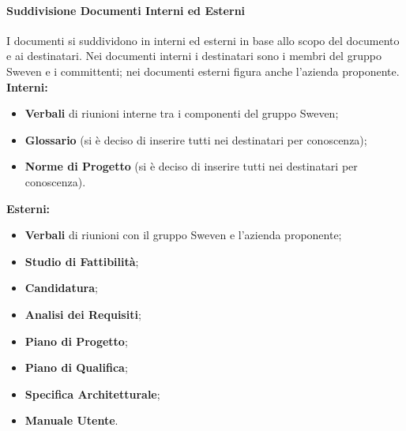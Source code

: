 \paragraph{Suddivisione Documenti Interni ed Esterni}
I documenti si suddividono in interni ed esterni in base allo scopo del documento e ai destinatari.
Nei documenti interni i destinatari sono i membri del gruppo Sweven e i committenti; nei documenti 
esterni figura anche l'azienda proponente. \newline
\textbf{Interni:}
\begin{itemize}
    \item \textbf{Verbali} di riunioni interne tra i componenti del gruppo Sweven;
    \item \textbf{Glossario} (si è deciso di inserire tutti nei destinatari per conoscenza);
    \item \textbf{Norme di Progetto} (si è deciso di inserire tutti nei destinatari per conoscenza).
\end{itemize}
\textbf{Esterni:}
\begin{itemize}
    \item \textbf{Verbali} di riunioni con il gruppo Sweven e l'azienda proponente;
    \item \textbf{Studio di Fattibilità};
    \item \textbf{Candidatura};
    \item \textbf{Analisi dei Requisiti};
    \item \textbf{Piano di Progetto};
    \item \textbf{Piano di Qualifica};
    \item \textbf{Specifica Architetturale};
    \item \textbf{Manuale Utente}.
\end{itemize}


